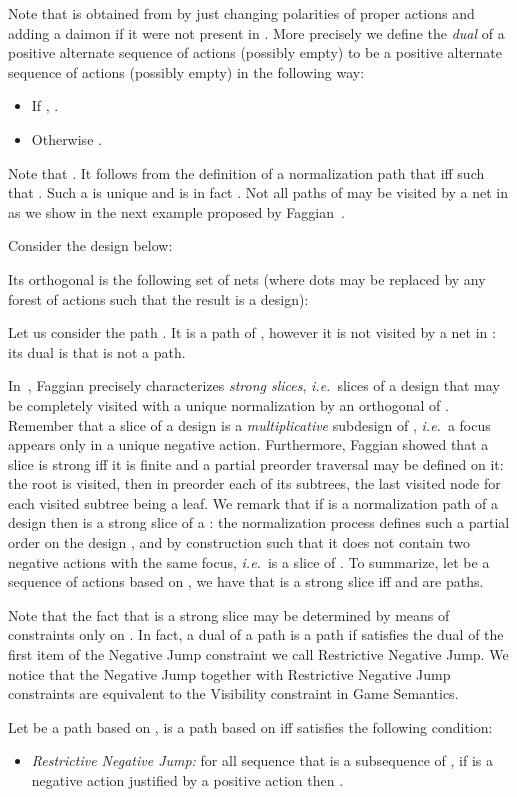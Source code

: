\documentclass{LMCS}
\def\ie{{\em i.e.}}
\begin{document}
Note that  is obtained from  by just changing polarities of proper actions and adding a daimon if it were not present in . 
More precisely we define the {\em dual} of a positive alternate sequence of actions  (possibly empty) to be a positive alternate sequence of actions  (possibly empty) in the following way:
\begin{itemize}
\item If , .
\item Otherwise .
\end{itemize}
 Note that .
It follows from the definition of a normalization path that  iff  such that .
Such a  is unique and is in fact .
Not all paths of  may be visited by a net in  as we show in the next example proposed by Faggian~\cite{DBLP:journals/tcs/Faggian06}.
\begin{exa}
Consider the design  below:
\begin{center}

\end{center}
Its orthogonal  is the following set of nets (where dots may be replaced by any forest of actions such that the result is a design):
\medskip

\noindent Let us consider the path . It is a path of , however it is not visited by a net in : its dual  is   that is not a path.
\end{exa}
In~\cite{DBLP:journals/tcs/Faggian06}, Faggian precisely characterizes {\em strong slices},  \ie\  slices of a design  that may be completely visited with a unique normalization by an orthogonal of . 
Remember that a slice of a design is a {\em multiplicative} subdesign of , \ie\ a focus appears only in a unique negative action.
Furthermore, Faggian showed that a slice is strong iff it is finite and a partial preorder traversal may be defined on it: the root is visited, then in preorder each of its subtrees, the last visited node for each visited subtree being a leaf.
We remark that if  is a normalization path of a design  then  is a strong slice of a : the normalization process defines such a partial order on the design , and by construction  such that it does not contain two negative actions with the same focus, \ie\  is a slice of .
To summarize, let  be a sequence of actions based on , we have that  is a strong slice iff  and  are paths.


Note that the fact that  is a strong slice may be determined by means of constraints  only on . In fact, a dual of a path  is a path if  satisfies the dual of the first item of the Negative Jump constraint we call Restrictive Negative Jump. 
We notice that the Negative Jump together with Restrictive Negative Jump constraints are equivalent to the Visibility constraint in Game Semantics.
\begin{prop}\label{prop:dualpath_restNegJump}
 Let  be a path based on ,  is a path based on  iff  satisfies the following condition:
\begin{itemize}
\item {\em Restrictive Negative Jump:} for all sequence  that is a subsequence of , if   is a negative action justified by a positive action  then .
\end{itemize}
\end{prop}
\end{document}
